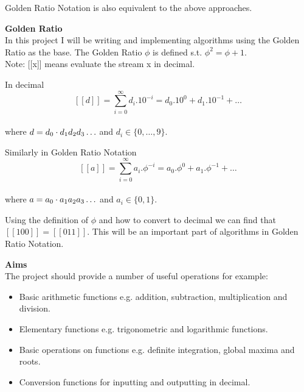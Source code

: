 Golden Ratio Notation is also equivalent to the above approaches.

{\bf Golden Ratio} \\
In this project I will be writing and implementing algorithms using the Golden Ratio as the base. The Golden Ratio $\phi$ is defined s.t. $\phi^{2}=\phi+1$. \\
Note: [[x]] means evaluate the stream x in decimal.

In decimal
\[ [[ d ]] = \sum_{i=0}^{\infty} d_{i}.10^{-i} = d_{0}.10^{0} + d_{1}.10^{-1} + \ldots \] \\
where \(d=d_{0}\/\cdot\/ d_{1} d_{2} d_{3} \ldots\) and \(d_{i} \in \{0, \ldots,9\}.\)

Similarly in Golden Ratio Notation
\[ [[ a ]] =\sum_{i=0}^{\infty} a_{i}.\phi^{-i} = a_{0}.\phi^{0} + a_{1}.\phi^{-1} + \ldots \] \\
 where \(a=a_{0}\/\cdot\/a_{1} a_{2} a_{3} \ldots\) and \(a_{i} \in \{0, 1\}.\)

Using the definition of $\phi$ and how to convert to decimal we can find that \([[ 100 ]] = [[ 011 ]]\). This will be an important part of algorithms in Golden Ratio Notation.

{\bf Aims} \\
The project should provide a number of useful operations for example:
\begin{itemize}
\item Basic arithmetic functions e.g.  addition, subtraction, multiplication and division.
\item Elementary functions e.g.  trigonometric and logarithmic functions.
\item Basic operations on functions e.g.  definite integration, global maxima and roots.
\item Conversion functions for inputting and outputting in decimal.
\end{itemize}
      

